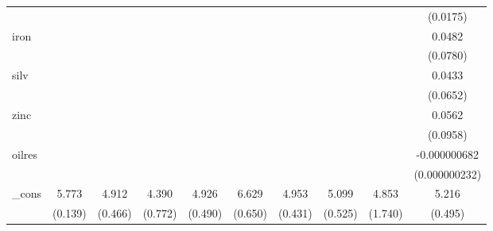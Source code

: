 {\begin{tabular}{l*{9}{c}}
            &                     &                     &                     &                     &                     &                     &                     &                     &    (0.0175)         \\
[1em]
iron        &                     &                     &                     &                     &                     &                     &                     &                     &      0.0482         \\
            &                     &                     &                     &                     &                     &                     &                     &                     &    (0.0780)         \\
[1em]
silv        &                     &                     &                     &                     &                     &                     &                     &                     &      0.0433         \\
            &                     &                     &                     &                     &                     &                     &                     &                     &    (0.0652)         \\
[1em]
zinc        &                     &                     &                     &                     &                     &                     &                     &                     &      0.0562         \\
            &                     &                     &                     &                     &                     &                     &                     &                     &    (0.0958)         \\
[1em]
oilres      &                     &                     &                     &                     &                     &                     &                     &                     &-0.000000682\sym{***}\\
            &                     &                     &                     &                     &                     &                     &                     &                     &(0.000000232)         \\
[1em]
\_cons      &       5.773\sym{***}&       4.912\sym{***}&       4.390\sym{***}&       4.926\sym{***}&       6.629\sym{***}&       4.953\sym{***}&       5.099\sym{***}&       4.853\sym{***}&       5.216\sym{***}\\
            &     (0.139)         &     (0.466)         &     (0.772)         &     (0.490)         &     (0.650)         &     (0.431)         &     (0.525)         &     (1.740)         &     (0.495)         \\

\end{tabular}}
